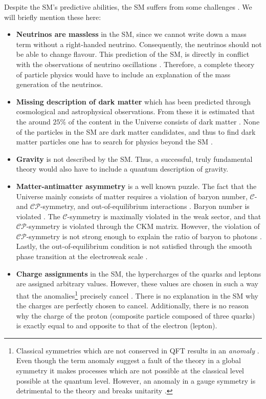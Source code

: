 Despite the SM's predictive abilities, the SM suffers from some challenges \cite{Pernow:2021fvb}. We will briefly mention these here: 
\begin{itemize}
    \item \textbf{Neutrinos are massless} in the SM, since we cannot write down a mass term without a right-handed neutrino. Consequently, the neutrinos should not be able to change flavour. This prediction of the SM, is directly in conflict with the observations of neutrino oscillations \cite{Pontecorvo:1967fh}. Therefore, a complete theory of particle physics would have to include an explanation of the mass generation of the neutrinos.
    \item \textbf{Missing description of dark matter} which has been predicted through cosmological \cite{WMAP:2012fli,Planck:2018vyg} and astrophysical \cite{Zwicky:1933gu,Rubin:1970zza, Clowe:2006eq} observations. From these it is estimated that the around $25\%$ of the content in the Universe consists of dark matter \cite{Planck:2018vyg}. None of the particles in the SM are dark matter candidates, and thus to find dark matter particles one has to search for physics beyond the SM \cite{Pernow:2021fvb}.
    \item \textbf{Gravity} is not described by the SM. Thus, a successful, truly fundamental theory would also have to include a quantum description of gravity.
    \item \textbf{Matter-antimatter asymmetry} is a well known puzzle. The fact that the Universe mainly consists of matter requires a violation of baryon number, $\mathcal{C}$- and $\mathcal{CP}$-symmetry, and out-of-equilibrium interactions \cite{Sakharov:1967dj}. Baryon number is violated \cite{Kuzmin:1985mm}. The $\mathcal{C}$-symmetry is maximally violated in the weak sector, and that $\mathcal{CP}$-symmetry is violated through the CKM matrix. However, the violation of $\mathcal{CP}$-symmetry is not strong enough to explain the ratio of baryon to photons \cite{Gavela:1993ts}. Lastly, the out-of-equilibrium condition is not satisfied through the smooth phase transition at the electroweak scale \cite{Kajantie:1996mn}. 
    \item \textbf{Charge assignments} in the SM, the hypercharges of the quarks and leptons are assigned arbitrary values. However, these values are chosen in such a way that the anomalies\footnote{Classical symmetries which are not conserved in QFT results in an \textit{anomaly} \cite{Bilal:2008qx}. Even though the term anomaly suggest a fault of the theory \cite{Zee:2010} in a global symmetry it makes processes which are not possible at the classical level possible at the quantum level. However, an anomaly in a gauge symmetry is detrimental to the theory and breaks unitarity \cite{Bilal:2008qx}.} precisely cancel \cite{Adler:1969gk,Bell:1969ts,Pernow:2021fvb}. There is no explanation in the SM why the charges are perfectly chosen to cancel. Additionally, there is no reason why the charge of the proton (composite particle composed of three quarks) is exactly equal to and opposite to that of the electron (lepton).

\end{itemize}

